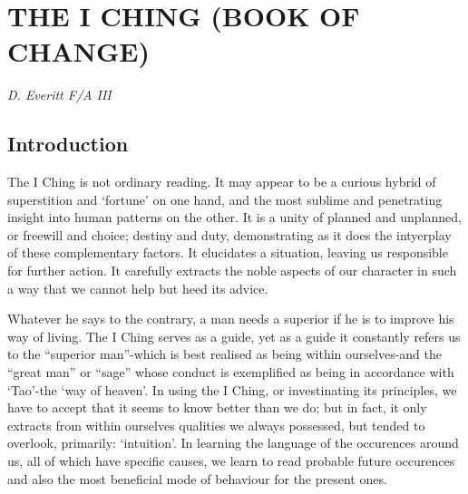 \documentclass[11pt]{book}
\author{Fania Everitt}
\date{15/09/2021}
\begin{document}
\frontmatter



\mainmatter

\chapter{THE I CHING (BOOK OF CHANGE)}

\emph{D. Everitt F/A III}


\section{Introduction}

The I Ching is not ordinary reading. It may appear to be a curious hybrid of superstition and `fortune' on one hand, and the most sublime and penetrating insight into human patterns on the other. It is a unity of planned and unplanned, or freewill and choice; destiny and duty, demonstrating as it does the intyerplay of these complementary factors. It elucidates a situation, leaving us responsible for further action. It carefully extracts the noble aspects of our character in such a way that we cannot help but heed its advice.

Whatever he says to the contrary, a man needs a superior if he is to improve his way of living. The I Ching serves as a guide, yet as a guide it constantly refers us to the ``superior man''-which is best realised as being within ourselves-and the ``great man'' or ``sage'' whose conduct is exemplified as being in accordance with `Tao'-the `way of heaven'. In using the I Ching, or investinating its principles, we have to accept that it seems to know better than we do; but in fact, it only extracts from within ourselves qualities we always possessed, but tended to overlook, primarily: `intuition'. In learning the language of the occurences around us, all of which have specific causes, we learn to read probable future occurences and also the most beneficial mode of behaviour for the present ones.
\end{document}
